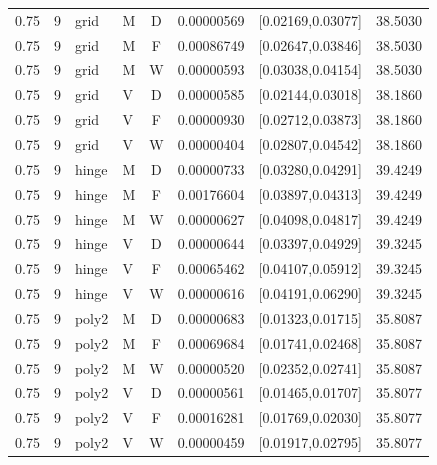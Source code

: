 \begin{longtable}{rrllcrrr}
0.75 & 9 & grid & M & D & 0.00000569 & [0.02169,0.03077] & 38.5030 \\

0.75 & 9 & grid & M & F & 0.00086749 & [0.02647,0.03846] & 38.5030 \\

0.75 & 9 & grid & M & W & 0.00000593 & [0.03038,0.04154] & 38.5030 \\

0.75 & 9 & grid & V & D & 0.00000585 & [0.02144,0.03018] & 38.1860 \\

0.75 & 9 & grid & V & F & 0.00000930 & [0.02712,0.03873] & 38.1860 \\

0.75 & 9 & grid & V & W & 0.00000404 & [0.02807,0.04542] & 38.1860 \\

0.75 & 9 & hinge & M & D & 0.00000733 & [0.03280,0.04291] & 39.4249 \\

0.75 & 9 & hinge & M & F & 0.00176604 & [0.03897,0.04313] & 39.4249 \\

0.75 & 9 & hinge & M & W & 0.00000627 & [0.04098,0.04817] & 39.4249 \\

0.75 & 9 & hinge & V & D & 0.00000644 & [0.03397,0.04929] & 39.3245 \\

0.75 & 9 & hinge & V & F & 0.00065462 & [0.04107,0.05912] & 39.3245 \\

0.75 & 9 & hinge & V & W & 0.00000616 & [0.04191,0.06290] & 39.3245 \\

0.75 & 9 & poly2 & M & D & 0.00000683 & [0.01323,0.01715] & 35.8087 \\

0.75 & 9 & poly2 & M & F & 0.00069684 & [0.01741,0.02468] & 35.8087 \\

0.75 & 9 & poly2 & M & W & 0.00000520 & [0.02352,0.02741] & 35.8087 \\

0.75 & 9 & poly2 & V & D & 0.00000561 & [0.01465,0.01707] & 35.8077 \\

0.75 & 9 & poly2 & V & F & 0.00016281 & [0.01769,0.02030] & 35.8077 \\

0.75 & 9 & poly2 & V & W & 0.00000459 & [0.01917,0.02795] & 35.8077 \\


\end{longtable}
